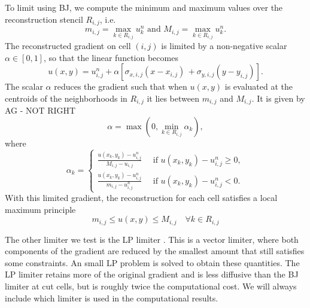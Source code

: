 To limit using BJ, we compute the minimum and maximum values over the
reconstruction stencil $R_{i,j}$, i.e.
\begin{equation}
     m_{i,j} = \max_{k \in R_{i,j}} {u}_k^n \text{ and } M_{i,j} = \max_{k \in R_{i,j}} 
     {u}_k^n.
\label{eqn:bj}
\end{equation}
The reconstructed gradient on cell $(i,j)$ is limited by a non-negative 
scalar $\alpha \in [0,1]$, so that the linear function becomes 
\begin{equation}
     u(x,y) = {u}_{i,j}^n + \alpha [{\sigma}_{x,i,j} ( x -  x_{i,j}) \, 
   + {\sigma}_{y,i,j}( y -  y_{i,j})].
\end{equation}
The scalar $\alpha$ reduces the gradient such that when ${u}(x,y)$ 
is evaluated at the centroids of the neighborhoods in $R_{i,j}$ it
lies between $m_{i,j}$ and $M_{i,j}$.
It is given by
AG - NOT RIGHT
$$
\alpha = \max\left(0,\min_{k \in R_{i,j}} \alpha_k \right),
$$
where
\begin{equation}
    \alpha_k = \begin{cases}
    \frac{{u}( x_{k},  y_{k}) - {u}_{i,j}^n}{M_{i,j} -
    {u}_{i,j}} \quad  \text{  if  } {u}( x_{k},  y_{k}) - {u}_{i,j}^n \geq 0,\\[.08in]
     \frac{{u}( x_{k},  y_{k}) - {u}_{i,j}^n}{m_{i,j} -
     {u}_{i,j}^n}  \quad \text{  if  } {u}(x_{k}, y_{k}) - {u}_{i,j}^n < 0.
    \end{cases}
\end{equation}
With this limited gradient, the reconstruction for each cell satisfies a
local maximum principle
\begin{equation}
m_{i,j} \le u(x,y) \le M_{i,j} \quad \forall k \in R_{i,j}
\end{equation}

The other limiter we test is the LP limiter 
\cite{May_Berger_LP}. This is a vector limiter, where both components of
the gradient are reduced by the smallest amount that still satisfies some
constraints. An small LP problem is solved to obtain these quantities.
The LP limiter retains more of the original gradient
and is less diffusive than the BJ limiter at cut cells, 
but is roughly twice the computational cost.
We will always include which limiter is used
in the computational results.  

